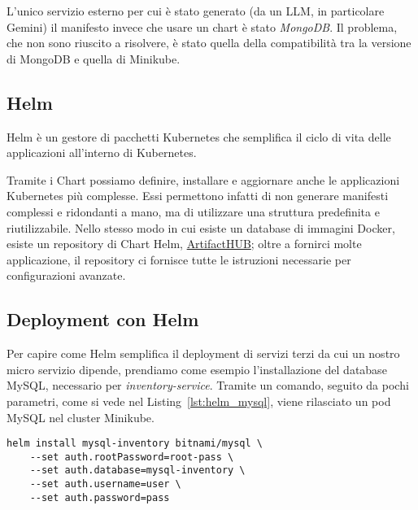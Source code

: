 \myskip

L'unico servizio esterno per cui è stato generato (da un LLM, in particolare Gemini) il manifesto invece che usare un chart è stato \textit{MongoDB}. Il problema, che non sono riuscito a risolvere, è stato quella della compatibilità tra la versione di MongoDB e quella di Minikube.

\subsection{Helm}
Helm è un gestore di pacchetti Kubernetes che semplifica il ciclo di vita delle applicazioni all'interno di Kubernetes.

Tramite i Chart possiamo definire, installare e aggiornare anche le applicazioni Kubernetes più complesse. Essi permettono infatti di non generare manifesti complessi e ridondanti a mano, ma di utilizzare una struttura predefinita e riutilizzabile. Nello stesso modo in cui esiste un database di immagini Docker, esiste un repository di Chart Helm, \href{https://artifacthub.io/}{ArtifactHUB}; oltre a fornirci molte applicazione, il repository ci fornisce tutte le istruzioni necessarie per configurazioni avanzate.

\subsection{Deployment con Helm}
Per capire come Helm semplifica il deployment di servizi terzi da cui un nostro micro servizio dipende, prendiamo come esempio l'installazione del database MySQL, necessario per \textit{inventory-service}. Tramite un comando, seguito da pochi parametri, come si vede nel Listing~\ref{lst:helm_mysql}, viene rilasciato un pod MySQL nel cluster Minikube.
\begin{lstlisting}[caption=MySQL Helm chart, label=lst:helm_mysql]
helm install mysql-inventory bitnami/mysql \
    --set auth.rootPassword=root-pass \
    --set auth.database=mysql-inventory \
    --set auth.username=user \
    --set auth.password=pass
\end{lstlisting}